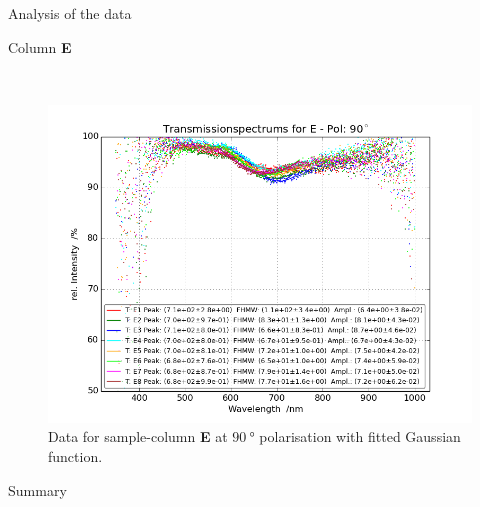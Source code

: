 \documentclass[pdftex, a4paper,11pt, twoside, UKenglish]{report}
\begin{document}
\begin{chapter}{Analysis of the data}
\begin{section}{Column \textbf{E}}
\begin{figure}[ht!]
\begin{minipage}{.95\textwidth}
          \label{fig:TransspecFIT_EPol0}
        \end{minipage}\\
        \begin{minipage}{.95\textwidth}
          \centering
          \includegraphics[width=\textwidth]
              {Figures/TransspecFIT_EPol90.png}
          \caption{Data for sample-column \textbf{E} at $\SI{90}{\degree}$
              polarisation with fitted Gaussian function.}
          \label{fig:TransspecFIT_EPol90}
        \end{minipage}
      \end{figure}
      
    \end{section}
    
    
    
    \begin{section}{Summary}
      \label{chp:AnalysisSummary}
      
      
      
    \end{section}
   
  \end{chapter}
  
  
  
  
  
  
  
  \begin{thebibliography}{99}
    \scriptsize
    
  \end{thebibliography}
 
\end{document}
